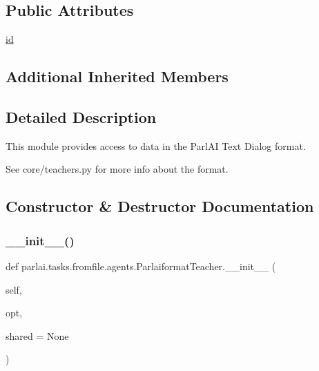 \subsection*{Public Attributes}
\begin{DoxyCompactItemize}
\item 
\hyperlink{classparlai_1_1tasks_1_1fromfile_1_1agents_1_1ParlaiformatTeacher_af21d1457ab02cd0d2d0583d1c543004f}{id}
\end{DoxyCompactItemize}
\subsection*{Additional Inherited Members}


\subsection{Detailed Description}
\begin{DoxyVerb}This module provides access to data in the ParlAI Text Dialog format.

See core/teachers.py for more info about the format.
\end{DoxyVerb}
 

\subsection{Constructor \& Destructor Documentation}
\mbox{\label{classparlai_1_1tasks_1_1fromfile_1_1agents_1_1ParlaiformatTeacher_a8d12f43b6359996764d176ba9a21189c}} 
\subsubsection{\texorpdfstring{\+\_\+\+\_\+init\+\_\+\+\_\+()}{\_\_init\_\_()}}
{\footnotesize\ttfamily def parlai.\+tasks.\+fromfile.\+agents.\+Parlaiformat\+Teacher.\+\_\+\+\_\+init\+\_\+\+\_\+ (\begin{DoxyParamCaption}\item[{}]{self,  }\item[{}]{opt,  }\item[{}]{shared = {\ttfamily None} }\end{DoxyParamCaption})}



